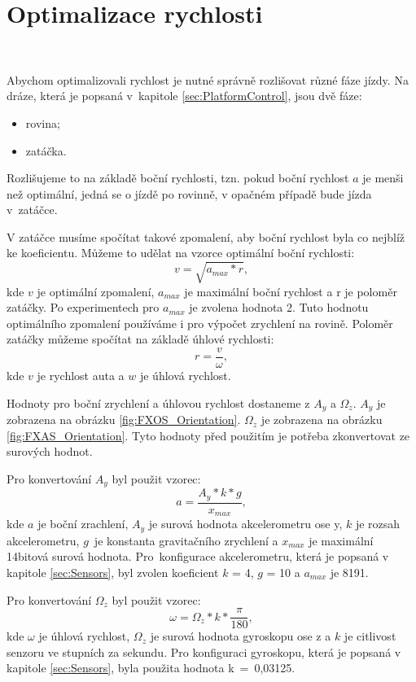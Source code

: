 \chapter{Optimalizace rychlosti}
\label{sec:SpeedOptimization}
\

Abychom optimalizovali rychlost je nutné správně rozlišovat různé fáze jízdy. Na
dráze, která je popsaná v~kapitole \ref{sec:PlatformControl}, jsou dvě fáze:
\begin{itemize}
	\item{rovina;}
	\item{zatáčka.}
\end{itemize}

Rozlišujeme to na základě boční rychlosti, tzn. pokud boční rychlost $a$ je menši než
optimální, jedná se o jízdě po rovinně, v opačném případě bude jízda v~zatáčce.

V zatáčce musíme spočítat takové zpomalení, aby boční rychlost byla
co nejblíž ke koeficientu. Můžeme to udělat na vzorce optimální boční
rychlosti:
\begin{equation}
v = \sqrt{a_{max} * r},
\end{equation}
kde $v$ je optimální zpomalení, $a_{max}$ je maximální boční rychlost a r je poloměr
zatáčky. Po experimentech pro $a_{max}$ je zvolena hodnota 2. Tuto hodnotu
optimálního zpomalení používáme i pro výpočet zrychlení na rovině. Poloměr zatáčky můžeme
spočítat na základě úhlové rychlosti:
\begin{equation}
r = \frac{v}{\omega},
\end{equation}
kde $v$ je rychlost auta a $w$ je úhlová rychlost.

Hodnoty pro boční zrychlení a úhlovou rychlost dostaneme z $A_y$ a $\Omega_z$. $A_y$ je
zobrazena na obrázku \ref{fig:FXOS_Orientation}. $\Omega_z$ je zobrazena na obrázku
\ref{fig:FXAS_Orientation}.
Tyto hodnoty před použitím je potřeba zkonvertovat ze surových
hodnot.

Pro konvertování $A_y$ byl použit vzorec:
\begin{equation}
a = \frac{A_y * k * g}{x_{max}},
\end{equation}
kde $a$ je boční zrachlení, $A_y$ je surová hodnota akcelerometru ose y,
$k$ je rozsah akcelerometru,  $g$~je konstanta gravitačního zrychlení a $x_{max}$ je
maximální 14bitová surová hodnota.  Pro~konfigurace akcelerometru, která je popsaná v kapitole
\ref{sec:Sensors}, byl zvolen koeficient $k$ = 4, $g$ = 10 a $a_{max}$ je 8191.

Pro konvertování $\Omega_z$ byl použit vzorec:
\begin{equation}
\omega = \Omega_z * k * \frac{\pi}{180},
\end{equation}
kde $\omega$ je úhlová rychlost, $\Omega_z$ je surová hodnota gyroskopu ose z
a $k$ je citlivost senzoru ve stupních za sekundu.
Pro konfiguraci gyroskopu, která je popsaná v kapitole
\ref{sec:Sensors}, byla použita hodnota k~=~0,03125.

\endinput
